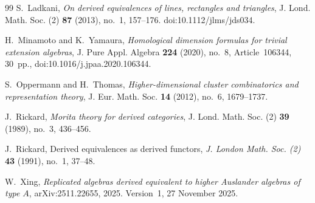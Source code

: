 \documentclass[12pt,a4paper,english,reqno]{amsart}
\theoremstyle{plain}
\theoremstyle{definition}
\begin{document}
\begin{thebibliography}{99}
S.~Ladkani,
\emph{On derived equivalences of lines, rectangles and triangles},
J. Lond. Math. Soc. (2) \textbf{87} (2013), no.~1, 157--176.
doi:10.1112/jlms/jds034.

H.~Minamoto and K.~Yamaura,
\emph{Homological dimension formulas for trivial extension algebras},
J. Pure Appl. Algebra \textbf{224} (2020), no.~8, Article~106344, 30~pp.,
doi:10.1016/j.jpaa.2020.106344.

S.~Oppermann and H.~Thomas,
\emph{Higher-dimensional cluster combinatorics and representation theory},
J. Eur. Math. Soc. \textbf{14} (2012), no.~6, 1679--1737.

J.~Rickard,
\emph{Morita theory for derived categories},
J. Lond. Math. Soc. (2) \textbf{39} (1989), no.~3, 436--456.


J.~Rickard,
Derived equivalences as derived functors,
\emph{J. London Math. Soc. (2)}
\textbf{43} (1991), no.~1, 37--48.

W.~Xing,
\emph{Replicated algebras derived equivalent to higher Auslander algebras
of type $A$},
arXiv:2511.22655, 2025.
Version~1, 27 November 2025.

\end{thebibliography}
\end{document}
